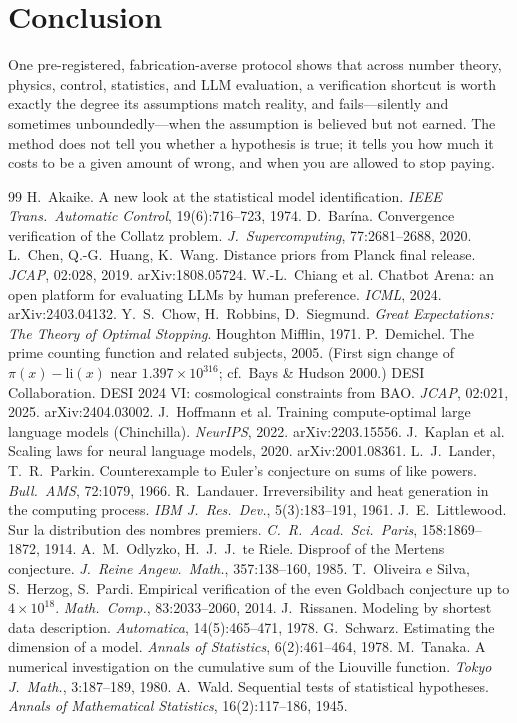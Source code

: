 \documentclass[11pt]{article}
\begin{document}
\section{Conclusion}
One pre-registered, fabrication-averse protocol shows that across number theory,
physics, control, statistics, and LLM evaluation, a verification shortcut is worth
exactly the degree its assumptions match reality, and fails---silently and
sometimes unboundedly---when the assumption is believed but not earned. The method
does not tell you whether a hypothesis is true; it tells you how much it costs to
be a given amount of wrong, and when you are allowed to stop paying.

\begin{thebibliography}{99}
 H.~Akaike. A new look at the statistical model identification. \emph{IEEE Trans.\ Automatic Control}, 19(6):716--723, 1974.
 D.~Bar\'ina. Convergence verification of the Collatz problem. \emph{J.\ Supercomputing}, 77:2681--2688, 2020.
 L.~Chen, Q.-G.~Huang, K.~Wang. Distance priors from Planck final release. \emph{JCAP}, 02:028, 2019. arXiv:1808.05724.
 W.-L.~Chiang et al. Chatbot Arena: an open platform for evaluating LLMs by human preference. \emph{ICML}, 2024. arXiv:2403.04132.
 Y.~S.~Chow, H.~Robbins, D.~Siegmund. \emph{Great Expectations: The Theory of Optimal Stopping}. Houghton Mifflin, 1971.
 P.~Demichel. The prime counting function and related subjects, 2005. (First sign change of $\pi(x)-\mathrm{li}(x)$ near $1.397\times10^{316}$; cf.\ Bays \& Hudson 2000.)
 DESI Collaboration. DESI 2024 VI: cosmological constraints from BAO. \emph{JCAP}, 02:021, 2025. arXiv:2404.03002.
 J.~Hoffmann et al. Training compute-optimal large language models (Chinchilla). \emph{NeurIPS}, 2022. arXiv:2203.15556.
 J.~Kaplan et al. Scaling laws for neural language models, 2020. arXiv:2001.08361.
 L.~J.~Lander, T.~R.~Parkin. Counterexample to Euler's conjecture on sums of like powers. \emph{Bull.\ AMS}, 72:1079, 1966.
 R.~Landauer. Irreversibility and heat generation in the computing process. \emph{IBM J.\ Res.\ Dev.}, 5(3):183--191, 1961.
 J.~E.~Littlewood. Sur la distribution des nombres premiers. \emph{C.\ R.\ Acad.\ Sci.\ Paris}, 158:1869--1872, 1914.
 A.~M.~Odlyzko, H.~J.~J.~te Riele. Disproof of the Mertens conjecture. \emph{J.\ Reine Angew.\ Math.}, 357:138--160, 1985.
 T.~Oliveira e Silva, S.~Herzog, S.~Pardi. Empirical verification of the even Goldbach conjecture up to $4\times10^{18}$. \emph{Math.\ Comp.}, 83:2033--2060, 2014.
 J.~Rissanen. Modeling by shortest data description. \emph{Automatica}, 14(5):465--471, 1978.
 G.~Schwarz. Estimating the dimension of a model. \emph{Annals of Statistics}, 6(2):461--464, 1978.
 M.~Tanaka. A numerical investigation on the cumulative sum of the Liouville function. \emph{Tokyo J.\ Math.}, 3:187--189, 1980.
 A.~Wald. Sequential tests of statistical hypotheses. \emph{Annals of Mathematical Statistics}, 16(2):117--186, 1945.
\end{thebibliography}
\end{document}
